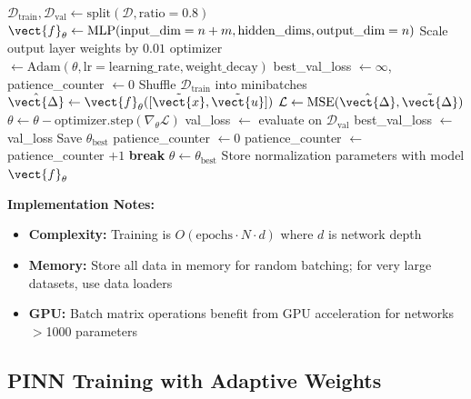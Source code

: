 \begin{algorithm}[H]
\begin{algorithmic}[1]
\STATE $\mathcal{D}_{\text{train}}, \mathcal{D}_{\text{val}} \gets \text{split}(\mathcal{D}, \text{ratio}=0.8)$
\STATE
\STATE {}
\STATE $\vect{f}_\theta \gets \text{MLP}(\text{input\_dim}=n+m, \text{hidden\_dims}, \text{output\_dim}=n)$
\STATE Scale output layer weights by $0.01$
\STATE
\STATE {}
\STATE optimizer $\gets \text{Adam}(\theta, \text{lr}=\text{learning\_rate}, \text{weight\_decay})$
\STATE best\_val\_loss $\gets \infty$, patience\_counter $\gets 0$
    \STATE Shuffle $\mathcal{D}_{\text{train}}$ into minibatches
        \STATE $\hat{\vect{\Delta}} \gets \vect{f}_\theta([\tilde{\vect{x}}, \tilde{\vect{u}}])$
        \STATE $\mathcal{L} \gets \text{MSE}(\hat{\vect{\Delta}}, \tilde{\vect{\Delta}})$
        \STATE $\theta \gets \theta - \text{optimizer.step}(\nabla_\theta \mathcal{L})$
    \ENDFOR
    \STATE
    \STATE {}
    \STATE val\_loss $\gets$ evaluate on $\mathcal{D}_{\text{val}}$
        \STATE best\_val\_loss $\gets$ val\_loss
        \STATE Save $\theta_{\text{best}}$
        \STATE patience\_counter $\gets 0$
    \ELSE
        \STATE patience\_counter $\gets$ patience\_counter $+ 1$
    \ENDIF
        \STATE \textbf{break} 
    \ENDIF
\ENDFOR
\STATE
\STATE {}
\STATE $\theta \gets \theta_{\text{best}}$
\STATE Store normalization parameters with model
\RETURN $\vect{f}_\theta$
\end{algorithmic}
\end{algorithm}

\textbf{Implementation Notes:}
\begin{itemize}
    \item \textbf{Complexity:} Training is $O(\text{epochs} \cdot N \cdot d)$ where $d$ is network depth
    \item \textbf{Memory:} Store all data in memory for random batching; for very large datasets, use data loaders
    \item \textbf{GPU:} Batch matrix operations benefit from GPU acceleration for networks $>$1000 parameters
\end{itemize}

\subsection{PINN Training with Adaptive Weights}
\label{subsec:alg_pinn}

